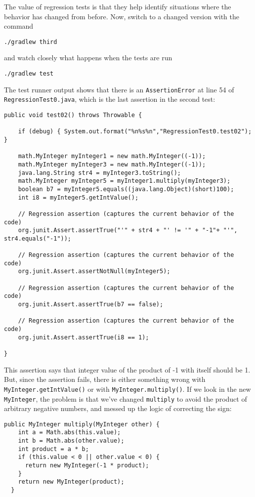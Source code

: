 \documentclass[11pt, oneside]{article} %
\newcommand{\code}[1]{{\texttt{#1}}}
\begin{document}
The value of regression tests is that they help identify situations where the behavior has changed from before. 
Now, switch to a changed version with the command
\begin{verbatim}
./gradlew third 
\end{verbatim}
and watch closely what happens when the tests are run
\begin{verbatim}
./gradlew test 
\end{verbatim}
The test runner output shows that there is an \code{AssertionError} at line 54 of \code{RegressionTest0.java}, which is the last assertion in the second test:
\begin{verbatim}
public void test02() throws Throwable {

    if (debug) { System.out.format("%n%s%n","RegressionTest0.test02"); }

    math.MyInteger myInteger1 = new math.MyInteger((-1));
    math.MyInteger myInteger3 = new math.MyInteger((-1));
    java.lang.String str4 = myInteger3.toString();
    math.MyInteger myInteger5 = myInteger1.multiply(myInteger3);
    boolean b7 = myInteger5.equals((java.lang.Object)(short)100);
    int i8 = myInteger5.getIntValue();
    
    // Regression assertion (captures the current behavior of the code)
    org.junit.Assert.assertTrue("'" + str4 + "' != '" + "-1"+ "'", str4.equals("-1"));
    
    // Regression assertion (captures the current behavior of the code)
    org.junit.Assert.assertNotNull(myInteger5);
    
    // Regression assertion (captures the current behavior of the code)
    org.junit.Assert.assertTrue(b7 == false);
    
    // Regression assertion (captures the current behavior of the code)
    org.junit.Assert.assertTrue(i8 == 1);

}
\end{verbatim}
This assertion says that integer value of the product of -1 with itself  should be 1.
But, since the assertion fails, there is either something wrong with \code{MyInteger.getIntValue()} or with \code{MyInteger.multiply()}.
If we look in the new \code{MyInteger}, the problem is that we've changed \code{multiply} to avoid the product of arbitrary negative numbers, and messed up the logic of correcting the sign:
\begin{verbatim}
public MyInteger multiply(MyInteger other) {
    int a = Math.abs(this.value);
    int b = Math.abs(other.value);
    int product = a * b;
    if (this.value < 0 || other.value < 0) {
      return new MyInteger(-1 * product);
    }
    return new MyInteger(product);
  }
\end{verbatim}
\end{document}

